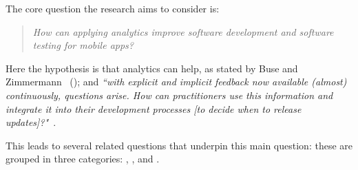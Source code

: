 The core question the research aims to consider is:
\begin{quote}
  \emph{How can applying analytics improve software development and software testing for mobile apps?}~\label{overall-research-question}  
\end{quote}

Here the hypothesis is that analytics can help, as stated by Buse and Zimmermann ~(\citeyear{buse_analytics_2010}); and \emph{``with explicit and implicit feedback now available (almost) continuously, questions arise. How can practitioners use this information and integrate it into their development processes [to decide when to release updates]?"}~\citep{maalej2016_towards_data_driven_requirements_engineering}.

This leads to several related questions that underpin this main question: these are grouped in three categories: \href{sec:sources}{\textbf{}}, \href{sec:value}{\textbf{}}, and \href{sec:impact}{\textbf{}}.





